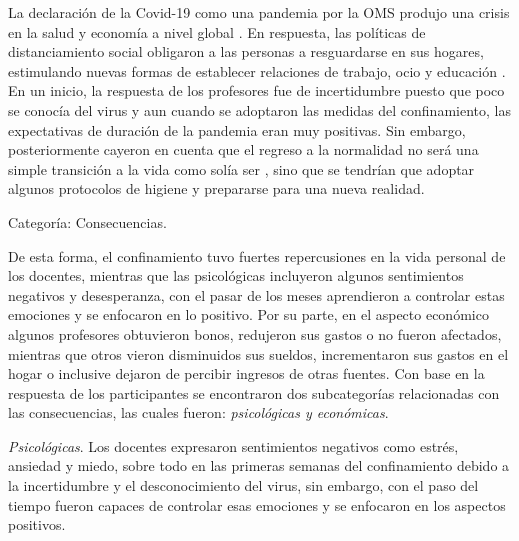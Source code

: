 \documentclass[spanish]{textolivre}
\begin{document}
La declaración de la Covid-19 como una pandemia por la OMS produjo una crisis en la salud y economía a nivel global \cite{world_health_organization_coronavirus_2020}. En respuesta, las políticas de distanciamiento social obligaron a las personas a resguardarse en sus hogares, estimulando nuevas formas de establecer relaciones de trabajo, ocio y educación \cite{valle_martinez_experiencia_2020}. En un inicio, la respuesta de los profesores fue de incertidumbre puesto que poco se conocía del virus y aun cuando se adoptaron las medidas del confinamiento, las expectativas de duración de la pandemia eran muy positivas. Sin embargo, posteriormente cayeron en cuenta que el regreso a la normalidad no será una simple transición a la vida como solía ser \cite{daniel_education_2020}, sino que se tendrían que adoptar algunos protocolos de higiene y prepararse para una nueva realidad.

Categoría: Consecuencias.

De esta forma, el confinamiento tuvo fuertes repercusiones en la vida personal de los docentes, mientras que las psicológicas incluyeron algunos sentimientos negativos y desesperanza, con el pasar de los meses aprendieron a controlar estas emociones y se enfocaron en lo positivo. Por su parte, en el aspecto económico algunos profesores obtuvieron bonos, redujeron sus gastos o no fueron afectados, mientras que otros vieron disminuidos sus sueldos, incrementaron sus gastos en el hogar o inclusive dejaron de percibir ingresos de otras fuentes. Con base en la respuesta de los participantes se encontraron dos subcategorías relacionadas con las consecuencias, las cuales fueron: \textit{psicológicas y económicas}.

\textit{Psicológicas}. Los docentes expresaron sentimientos negativos como estrés, ansiedad y miedo, sobre todo en las primeras semanas del confinamiento debido a la incertidumbre y el desconocimiento del virus, sin embargo, con el paso del tiempo fueron capaces de controlar esas emociones y se enfocaron en los aspectos positivos. 
\end{document}
